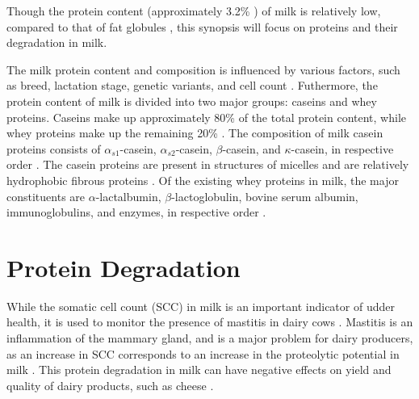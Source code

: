 \vspace{0.5em}
Though the protein content (approximately 3.2\% \cite*{s09_milk_secretion_and_ejection}) of milk is relatively low, compared to that of fat globules \cite*{b01_milk_biochemistry}, this synopsis will focus on proteins and their degradation in milk.

\vspace{0.5em}
The milk protein content and composition is influenced by various factors, such as breed, lactation stage, genetic variants, and cell count \cite*{s04_protein_fraction_in_milk}. Futhermore, the protein content of milk is divided into two major groups: caseins and whey proteins. Caseins make up approximately 80\% of the total protein content, while whey proteins make up the remaining 20\% \cite*{s04_protein_fraction_in_milk}. The composition of milk casein proteins consists of $\alpha_{s1}$-casein, $\alpha_{s2}$-casein, $\beta$-casein, and $\kappa$-casein, in respective order \cite*{s04_protein_fraction_in_milk}. The casein proteins are present in structures of micelles and are relatively hydrophobic fibrous proteins \cite*{b01_milk_biochemistry}. Of the existing whey proteins in milk, the major constituents are $\alpha$-lactalbumin, $\beta$-lactoglobulin, bovine serum albumin, immunoglobulins, and enzymes, in respective order \cite*{s04_protein_fraction_in_milk}.




%


\section{Protein Degradation}
While the somatic cell count (SCC) in milk is an important indicator of udder health, it is used to monitor the presence of mastitis in dairy cows \cite*{s05_mastitis_complex}. Mastitis is an inflammation of the mammary gland, and is a major problem for dairy producers, as an increase in SCC corresponds to an increase in the proteolytic potential in milk \cite*{a02_proteases_and_protein_degradation}. This protein degradation in milk can have negative effects on yield and quality of dairy products, such as cheese \cite*{a02_proteases_and_protein_degradation}.


